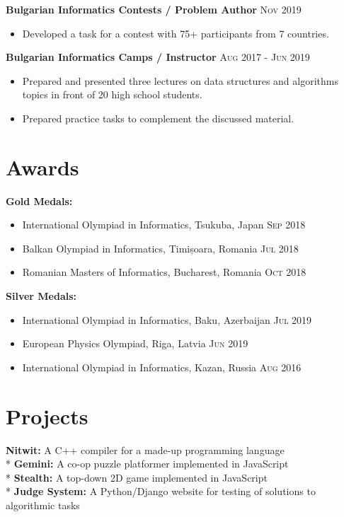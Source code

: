 \documentclass[letterpaper,11pt]{article}
\newcommand{\noskip}{\vspace{-\parskip}}
\newcommand{\doskip}{\vspace{\parskip}}
\begin{document}
\textbf{Bulgarian Informatics Contests / Problem Author}
\hfill
\textsc{Nov 2019}
\noskip
\begin{itemize}
    \item Developed a task for a contest with 75+ participants from 7
        countries.
\end{itemize}

\textbf{Bulgarian Informatics Camps / Instructor}
\hfill
\textsc{Aug 2017 - Jun 2019}
\noskip
\begin{itemize}
    \item Prepared and presented three lectures on data structures and
        algorithms topics in front of 20 high school students.
    \item Prepared practice tasks to complement the discussed material.
\end{itemize}

\section*{Awards}
\textbf{Gold Medals:}
\noskip
\begin{itemize}
    \item International Olympiad in Informatics, Tsukuba, Japan
        \hfill \textsc{Sep 2018}
    \item Balkan Olympiad in Informatics, Timișoara, Romania
        \hfill \textsc{Jul 2018}
    \item Romanian Masters of Informatics, Bucharest, Romania
        \hfill \textsc{Oct 2018}
\end{itemize}

\textbf{Silver Medals:}
\noskip
\begin{itemize}
    \item International Olympiad in Informatics, Baku, Azerbaijan
        \hfill \textsc{Jul 2019}
    \item European Physics Olympiad, Riga, Latvia
        \hfill \textsc{Jun 2019}
    \item International Olympiad in Informatics, Kazan, Russia
        \hfill \textsc{Aug 2016}
\end{itemize}

\section*{Projects}
\textbf{Nitwit:} A C++ compiler for a made-up programming language\\*
\textbf{Gemini:} A co-op puzzle platformer implemented in JavaScript\\*
\textbf{Stealth:} A top-down 2D game implemented in JavaScript\\*
\textbf{Judge System:} A Python/Django website for testing of solutions
to algorithmic tasks
\end{document}
